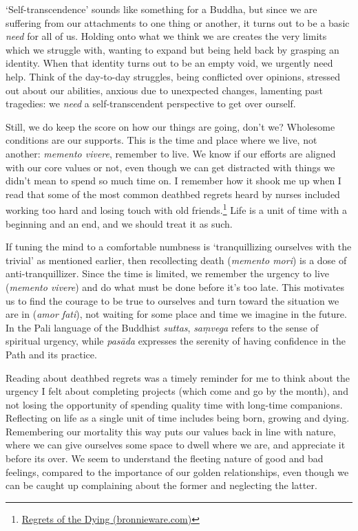 `Self-transcendence' sounds like something for a Buddha, but since we
are suffering from our attachments to one thing or another, it turns out
to be a basic \emph{need} for all of us. Holding onto what we think we
are creates the very limits which we struggle with, wanting to expand
but being held back by grasping an identity. When that identity turns
out to be an empty void, we urgently need help. Think of the day-to-day
struggles, being conflicted over opinions, stressed out about our
abilities, anxious due to unexpected changes, lamenting past tragedies:
we \emph{need} a self-transcendent perspective to get over ourself.

Still, we do keep the score on how our things are going, don't we?
Wholesome conditions are our supports. This is the time and place where
we live, not another: \emph{memento vivere}, remember to live. We know
if our efforts are aligned with our core values or not, even though we
can get distracted with things we didn't mean to spend so much time on.
I remember how it shook me up when I read that some of the most common
deathbed regrets heard by nurses included working too hard and losing
touch with old friends.\footnote{\href{https://bronnieware.com/blog/regrets-of-the-dying/}{Regrets
  of the Dying (bronnieware.com)}} Life is a unit of time with a
beginning and an end, and we should treat it as such.

\clearpage


If tuning the mind to a comfortable numbness is `tranquillizing
ourselves with the trivial' as mentioned earlier, then recollecting
death (\emph{memento mori}) is a dose of anti-tranquillizer. Since the
time is limited, we remember the urgency to live (\emph{memento vivere})
and do what must be done before it's too late. This motivates us to find
the courage to be true to ourselves and turn toward the situation we are
in (\emph{amor fati}), not waiting for some place and time we imagine in
the future. In the Pali language of the Buddhist \emph{suttas},
\emph{saṃvega} refers to the sense of spiritual urgency, while
\emph{pasāda} expresses the serenity of having confidence in the Path
and its practice.

Reading about deathbed regrets was a timely reminder for me to think
about the urgency I felt about completing projects (which come and go by
the month), and not losing the opportunity of spending quality time with
long-time companions. Reflecting on life as a single unit of time
includes being born, growing and dying. Remembering our mortality this
way puts our values back in line with nature, where we can give
ourselves some space to dwell where we are, and appreciate it before its
over. We seem to understand the fleeting nature of good and bad
feelings, compared to the importance of our golden relationships, even
though we can be caught up complaining about the former and neglecting
the latter.

